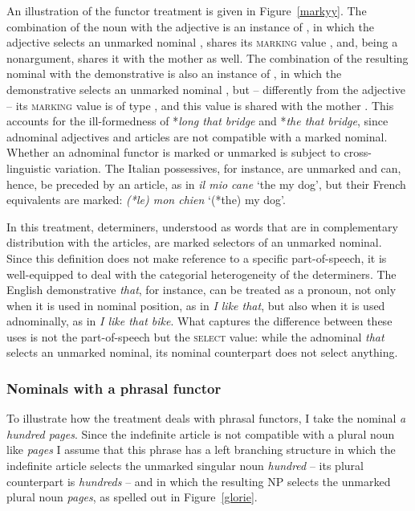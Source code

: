 \documentclass[output=paper
	        ,collection
	        ,collectionchapter
 	        ,biblatex
                ,babelshorthands
                ,newtxmath
                ,draftmode
                ,colorlinks, citecolor=brown
]{langscibook}
\begin{document}
An illustration of the functor treatment is given in Figure~\ref{markyy}.
The combination of the noun with the adjective is an instance of , 
in which the adjective selects an unmarked nominal ,  
shares its \textsc{marking} value , and, being a nonargument, 
shares it with the mother as well. 
The combination of the resulting nominal with the demonstrative is also 
an instance of ,
in which the demonstrative selects an unmarked nominal , 
but -- differently from the adjective -- its \textsc{marking} value is of type 
, and this value is shared with the mother .    
This accounts for the ill-formedness of 
*\emph{long that bridge} and *\emph{the that bridge}, since 
adnominal adjectives and articles are not compatible with a marked nominal.  
Whether an adnominal functor is marked or unmarked is subject to cross-linguistic variation. 
The Italian possessives, for instance, are unmarked and can, hence, be preceded 
by an article, as in \emph{il mio cane} `the my dog', but   
their French equivalents are marked: \emph{(*le) mon chien} `(*the) my dog'. 

In this treatment, determiners, understood as words that are in complementary distribution with 
the articles, are marked selectors of an unmarked nominal. Since this definition does not 
make reference to a specific part-of-speech, it is well-equipped to deal with the categorial 
heterogeneity of the determiners. The English demonstrative \emph{that}, for instance, 
can be treated as a pronoun, not only when it is used in nominal position, as in 
\emph{I like that}, but also when it is used adnominally, as in \emph{I like that bike}.   
What captures the difference between these uses is not the part-of-speech but  
the \textsc{select} value: while the adnominal \emph{that} selects an unmarked nominal, 
its nominal counterpart does not select anything.      

        
\subsubsection{Nominals with a phrasal functor} 
\label{sec-phrasal-spec}


To illustrate how the treatment deals with phrasal functors, I
take the nominal \emph{a hundred pages}. Since the indefinite article is not 
compatible with a plural noun like \emph{pages} I assume that this phrase  
has a left branching structure in which the indefinite article selects 
the unmarked singular noun \emph{hundred} -- its plural counterpart is \emph{hundreds} --  
and in which the resulting NP selects the unmarked plural noun 
\emph{pages}, as spelled out in Figure~\ref{glorie}. 
 
\end{document}
